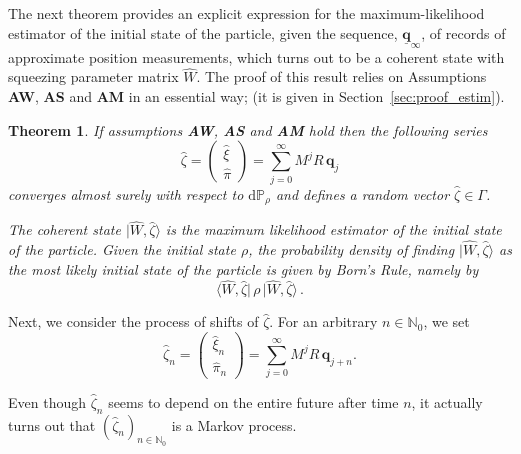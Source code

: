 \documentclass[12pt]{article}
\newtheorem{theorem}{Theorem}[section]
\newcommand{\ket}[1]{|{#1}\rangle}
\renewcommand{\d}{{\mathrm d}}
\begin{document}
The next theorem provides an explicit expression for the maximum-likelihood estimator of the initial state of the particle, given the sequence, $\underline{\mathbf q}_\infty$, of records of approximate position measurements, which turns out to be a coherent state with squeezing parameter matrix $\widehat{W}$.
The proof of this result relies on Assumptions {\bf{AW}}, {\bf{AS}} and {\bf{AM}} in an essential way; (it is given in Section~\ref{sec:proof_estim}).

\begin{theorem}\label{estimation} 
If assumptions {\bf{AW}}, {\bf{AS}} and {\bf{AM}} hold then the following series 
\begin{equation}\label{MLE}
\widehat{\zeta} = \left( \begin{array}{c}
\widehat{\xi} \\
\widehat{\pi}
\end{array}
\right) = \sum_{j=0}^\infty M^{j} R \,\mathbf{q}_j
\end{equation}
converges almost surely with respect to $\d\mathbb{P}_\rho$ and defines a random vector $\widehat{\zeta}\in \Gamma$.

The coherent state $\ket{\widehat{W}, \widehat{\zeta}}$ is the maximum likelihood estimator 
of the initial state of the particle. Given the initial state $\rho$, the probability density of finding $\ket{\widehat{W}, \widehat{\zeta}}$
as the most likely initial state  of the particle is given by Born's Rule, namely by 
$$\langle \widehat{W}, \widehat{\zeta}\vert\,\rho\, \vert \widehat{W}, \widehat{\zeta}\rangle\,.$$

\end{theorem}

Next, we consider the process of shifts of $\widehat{\zeta}$. For an arbitrary $n\in \mathbb N_0$, we set
\begin{equation}\label{MLEn}
\widehat{\zeta}_n = \left( \begin{array}{c}
\widehat{\xi}_n \\
\widehat{\pi}_n
\end{array}
\right) = \sum_{j=0}^\infty M^{j} R\, \mathbf q_{j+n}.
\end{equation}

Even though $\widehat{\zeta}_n$ seems to depend on the entire future after time $n$, it actually turns out that
$(\widehat{\zeta}_n)_{n\in \mathbb N_0}$ is a Markov process.
\end{document}
